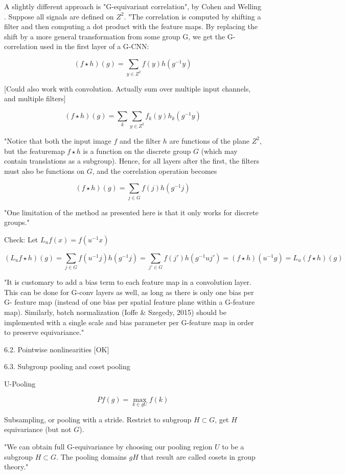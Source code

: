 \documentclass[english]{article}
\begin{document}
A slightly different approach is "G-equivariant correlation", by Cohen and Welling . Suppose all signals are defined on $Z^2$. "The correlation is computed by shifting a filter and then computing a dot product with the feature maps. By
replacing the shift by a more general transformation from
some group G, we get the G-correlation used in the first
layer of a G-CNN: 

$$(f \star h)(g) = \sum_{y\in Z^2} f(y)h(g^{-1}y)$$

[Could also work with convolution. Actually sum over multiple input channels, and multiple filters]

$$(f \star h)(g) = \sum_k\sum_{y\in Z^2} f_k(y)h_k(g^{-1}y)$$

"Notice that both the input image $f$ and the filter $h$ are functions of the plane $Z^2$, but the featuremap $f \star h$ is a function
on the discrete group $G$ (which may contain translations as
a subgroup). Hence, for all layers after the first, the filters
must also be functions on $G$, and the correlation operation
becomes

$$(f \star h)(g) = \sum_{j\in G} f(j)h(g^{-1}j)$$

"One limitation of the method as presented here is that
it only works for discrete groups."

Check: Let $L_uf(x) = f(u^{-1}x)$

$$
(L_u f \star h)(g) 
= \sum_{j\in G} f(u^{-1}j)h(g^{-1}j)
= \sum_{j'\in G} f(j')h(g^{-1}uj')
= (f \star h)(u^{-1}g) 
= L_u (f \star h)(g) 
$$

"It is customary to add a bias term to each feature map
in a convolution layer. This can be done for G-conv
layers as well, as long as there is only one bias per G-
feature map (instead of one bias per spatial feature plane
within a G-feature map). Similarly, batch normalization
(Ioffe \& Szegedy, 2015) should be implemented with a single scale and bias parameter per G-feature map in order
to preserve equivariance."

6.2. Pointwise nonlinearities [OK]

6.3. Subgroup pooling and coset pooling

U-Pooling 

$$Pf(g) = \max_{k\in gU} f(k)$$

Subsampling, or pooling with a stride. Restrict to subgroup $H \subset G$, get $H$ equivariance (but not $G$). 


"We can obtain full G-equivariance by choosing our pooling
region $U$ to be a subgroup $H \subset G$. The pooling domains
$gH$ that result are called cosets in group theory."
\end{document}
